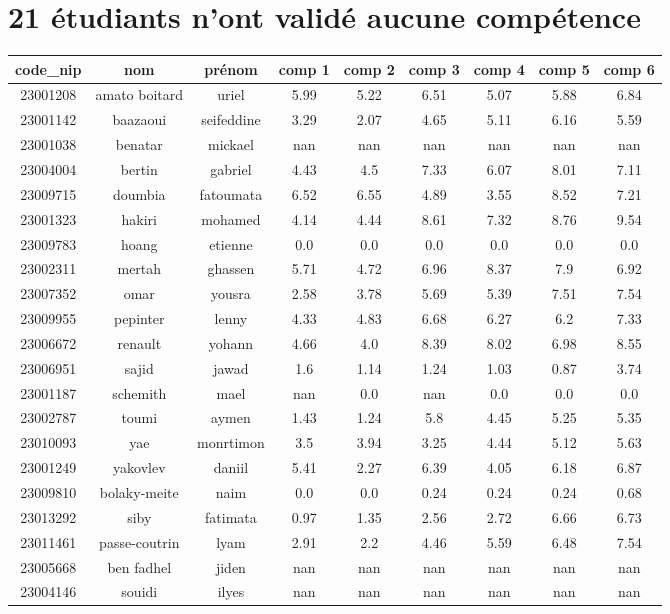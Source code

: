 \documentclass{article}%
\begin{document}
\section{21 étudiants n'ont validé aucune compétence}%
\label{sec:21tudiantsnontvalidaucunecomptence}%
\begin{tabular}{|c|c|c|c|c|c|c|c|c|}%
\hline%
\rowcolor{bleu}%
code\_nip&nom&prénom&comp 1&comp 2&comp 3&comp 4&comp 5&comp 6\\%
\hline%
23001208&amato boitard&uriel&5.99&5.22&6.51&5.07&5.88&6.84\\%
\hline%
23001142&baazaoui&seifeddine&3.29&2.07&4.65&5.11&6.16&5.59\\%
\hline%
23001038&benatar&mickael&nan&nan&nan&nan&nan&nan\\%
\hline%
23004004&bertin&gabriel&4.43&4.5&7.33&6.07&8.01&7.11\\%
\hline%
23009715&doumbia&fatoumata&6.52&6.55&4.89&3.55&8.52&7.21\\%
\hline%
23001323&hakiri&mohamed&4.14&4.44&8.61&7.32&8.76&9.54\\%
\hline%
23009783&hoang&etienne&0.0&0.0&0.0&0.0&0.0&0.0\\%
\hline%
23002311&mertah&ghassen&5.71&4.72&6.96&8.37&7.9&6.92\\%
\hline%
23007352&omar&yousra&2.58&3.78&5.69&5.39&7.51&7.54\\%
\hline%
23009955&pepinter&lenny&4.33&4.83&6.68&6.27&6.2&7.33\\%
\hline%
23006672&renault&yohann&4.66&4.0&8.39&8.02&6.98&8.55\\%
\hline%
23006951&sajid&jawad&1.6&1.14&1.24&1.03&0.87&3.74\\%
\hline%
23001187&schemith&mael&nan&0.0&nan&0.0&0.0&0.0\\%
\hline%
23002787&toumi&aymen&1.43&1.24&5.8&4.45&5.25&5.35\\%
\hline%
23010093&yae&monrtimon&3.5&3.94&3.25&4.44&5.12&5.63\\%
\hline%
23001249&yakovlev&daniil&5.41&2.27&6.39&4.05&6.18&6.87\\%
\hline%
23009810&bolaky{-}meite&naim&0.0&0.0&0.24&0.24&0.24&0.68\\%
\hline%
23013292&siby&fatimata&0.97&1.35&2.56&2.72&6.66&6.73\\%
\hline%
23011461&passe{-}coutrin&lyam&2.91&2.2&4.46&5.59&6.48&7.54\\%
\hline%
23005668&ben fadhel&jiden&nan&nan&nan&nan&nan&nan\\%
\hline%
23004146&souidi&ilyes&nan&nan&nan&nan&nan&nan\\%
\hline%
\end{tabular}

%
\end{document}
